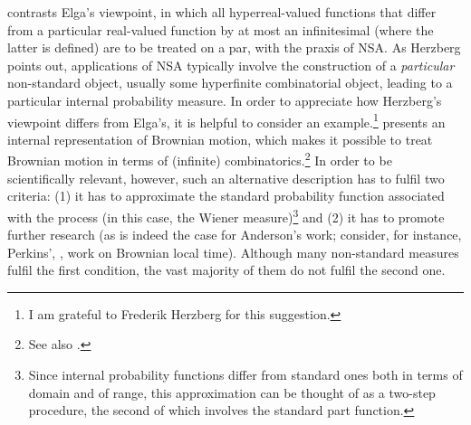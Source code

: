 \citet{Herzberg:2007a} contrasts Elga's viewpoint, in which all hyper\-real-valued functions that differ from a particular real-valued function by at most an infinitesimal (where the latter is defined) are to be treated on a par, with the praxis of NSA. As Herzberg points out, applications of NSA typically involve the construction of a \emph{particular} non-standard object, usually some hyperfinite combinatorial object, leading to a particular internal probability measure.
In order to appreciate how Herzberg's viewpoint differs from Elga's, it is helpful to consider an example.\footnote{I am grateful to Frederik Herzberg for this suggestion.} \citet{Anderson:1976} presents an internal representation of Brownian motion, which makes it possible to treat Brownian motion in terms of (infinite) combinatorics.\footnote{See also \citet[section~3.3]{Albeverio_etal:1986}.} In order to be scientifically relevant, however, such an alternative description has to fulfil two criteria: (1) it has to approximate the standard probability function associated with the process (in this case, the Wiener measure)\footnote{Since internal probability functions differ from standard ones both in terms of domain and of range, this approximation can be thought of as a two-step procedure, the second of which involves the standard part function.} and (2) it has to promote further research (as is indeed the case for Anderson's work; consider, for instance, Perkins', , work on Brownian local time). Although many non-standard measures fulfil the first condition, the vast majority of them do not fulfil the second one.

